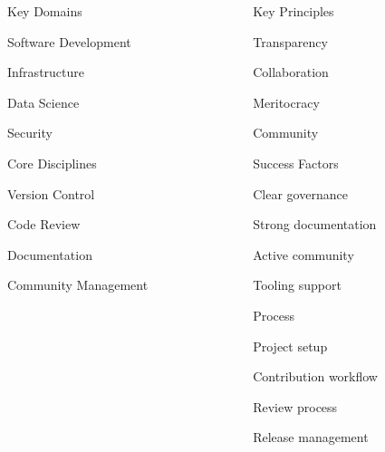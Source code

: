 \documentclass{beamer}
\begin{document}
\begin{frame}[t]
\begin{columns}[t]
\begin{column}{0.32\textwidth}
            \begin{innersourcesection}{\domainsicon}{Key Domains}
                \item Software Development
                \item Infrastructure
                \item Data Science
                \item Security
            \end{innersourcesection}
            
            \begin{innersourcesection}{\disciplinesicon}{Core Disciplines}
                \item Version Control
                \item Code Review
                \item Documentation
                \item Community Management
            \end{innersourcesection}
        \end{column}
        
        \begin{column}{0.32\textwidth}
            \begin{innersourcesection}{\principlesicon}{Key Principles}
                \item Transparency
                \item Collaboration
                \item Meritocracy
                \item Community
            \end{innersourcesection}
            
            \begin{innersourcesection}{\successicon}{Success Factors}
                \item Clear governance
                \item Strong documentation
                \item Active community
                \item Tooling support
            \end{innersourcesection}
            
            \begin{innersourcesection}{\processicon}{Process}
                \item Project setup
                \item Contribution workflow
                \item Review process
                \item Release management
            \end{innersourcesection}
        \end{column}
    \end{columns}
\end{frame}
\end{document}
